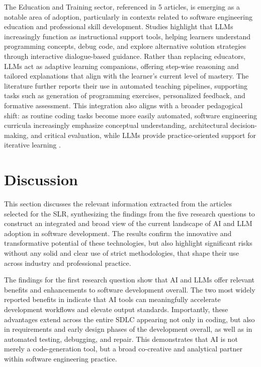 The Education and Training sector, referenced in 5 articles, is emerging as a notable area of adoption, particularly in contexts related to software engineering education and professional skill development. Studies highlight that LLMs increasingly function as instructional support tools, helping learners understand programming concepts, debug code, and explore alternative solution strategies through interactive dialogue-based guidance. Rather than replacing educators, LLMs act as adaptive learning companions, offering step-wise reasoning and tailored explanations that align with the learner’s current level of mastery. The literature further reports their use in automated teaching pipelines, supporting tasks such as generation of programming exercises, personalized feedback, and formative assessment. This integration also aligns with a broader pedagogical shift: as routine coding tasks become more easily automated, software engineering curricula increasingly emphasize conceptual understanding, architectural decision-making, and critical evaluation, while LLMs provide practice-oriented support for iterative learning \cite{Ramos:2025aa, Zhang:2025ea, Hemmat:2025rd, Hou:2025cl, Zamfiroiu:2025ec}.

\section{Discussion}

This section discusses the relevant information extracted from the articles selected for the SLR, synthesizing the findings from the five research questions to construct an integrated and broad view of the current landscape of AI and LLM adoption in software development. The results confirm the innovative and transformative potential of these technologies, but also highlight significant risks without any solid and clear use of strict methodologies, that shape their use across industry and professional practice.

The findings for the first research question show that AI and LLMs offer relevant benefits and enhancements to software development overall. The two most widely reported benefits in  indicate that AI tools can meaningfully accelerate development workflows and elevate output standards. Importantly, these advantages extend across the entire SDLC appearing not only in coding, but also in requirements and early design phases of the development overall, as well as in automated testing, debugging, and repair. This demonstrates that AI is not merely a code-generation tool, but a broad co-creative and analytical partner within software engineering practice. 

